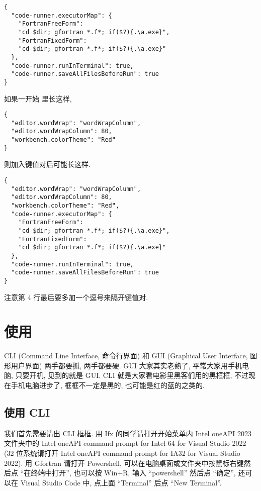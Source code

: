 \begin{lstlisting}[numbers=none]
{
  "code-runner.executorMap": {
    "FortranFreeForm":
    "cd $dir; gfortran *.f*; if($?){.\a.exe}",
    "FortranFixedForm":
    "cd $dir; gfortran *.f*; if($?){.\a.exe}"
  },
  "code-runner.runInTerminal": true,
  "code-runner.saveAllFilesBeforeRun": true
}
\end{lstlisting}
如果一开始  里长这样,
\begin{lstlisting}[numbers=none]
{
  "editor.wordWrap": "wordWrapColumn",
  "editor.wordWrapColumn": 80,
  "workbench.colorTheme": "Red"
}
\end{lstlisting}
则加入键值对后可能长这样.
\begin{lstlisting}[numbers=none]
{
  "editor.wordWrap": "wordWrapColumn",
  "editor.wordWrapColumn": 80,
  "workbench.colorTheme": "Red",
  "code-runner.executorMap": {
    "FortranFreeForm":
    "cd $dir; gfortran *.f*; if($?){.\a.exe}",
    "FortranFixedForm":
    "cd $dir; gfortran *.f*; if($?){.\a.exe}"
  },
  "code-runner.runInTerminal": true,
  "code-runner.saveAllFilesBeforeRun": true
}
\end{lstlisting}
注意第 4 行最后要多加一个逗号来隔开键值对.

\section{使用}

CLI (Command Line Interface, 命令行界面) 和 GUI (Graphical User Interface, 图形用户界面) 两手都要抓, 两手都要硬. GUI 大家其实老熟了, 平常大家用手机电脑, 只要开机, 见到的就是 GUI. CLI 就是大家看电影里黑客们用的黑框框, 不过现在手机电脑进步了, 框框不一定是黑的, 也可能是红的蓝的之类的.

\subsection{使用 CLI}\label{use_ifx}\label{use_gfortran}

我们首先需要请出 CLI 框框. 用 Ifx 的同学请打开开始菜单内 Intel oneAPI 2023 文件夹中的 Intel oneAPI command prompt for Intel 64 for Visual Studio 2022 (32 位系统请打开 Intel oneAPI command prompt for IA32 for Visual Studio 2022). 用 Gfortran 请打开 Powershell, 可以在电脑桌面或文件夹中按鼠标右键然后点 ``在终端中打开'', 也可以按 Win+R, 输入 ``powershell'' 然后点 ``确定'', 还可以在 Visual Studio Code 中, 点上面 ``Terminal'' 后点 ``New Terminal''.


